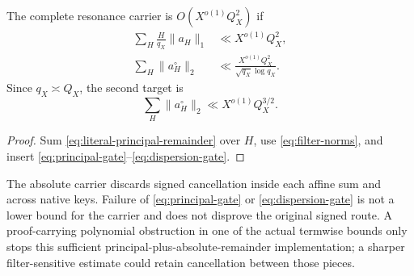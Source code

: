 \begin{corollary}
\label{cor:sufficient-gate}
The complete resonance carrier is
\(O(X^{o(1)}Q_X^2)\) if
\begin{align}
 \sum_H\frac{H}{q_X}\|a_H\|_1
 &\ll X^{o(1)}Q_X^2,
\label{eq:principal-gate}\\
 \sum_H\|a_H^\circ\|_2
 &\ll
 \frac{X^{o(1)}Q_X^2}
 {\sqrt{q_X}\log q_X}.
\label{eq:dispersion-gate}
\end{align}
Since \(q_X\asymp Q_X\), the second target is
\[
 \sum_H\|a_H^\circ\|_2
 \ll
 X^{o(1)}Q_X^{3/2}.
\]
\end{corollary}

\begin{proof}
Sum \eqref{eq:literal-principal-remainder} over \(H\), use
\eqref{eq:filter-norms}, and insert
\eqref{eq:principal-gate}--\eqref{eq:dispersion-gate}.
\end{proof}

\begin{remark}
The absolute carrier discards signed cancellation inside each affine
sum and across native keys.  Failure of
\eqref{eq:principal-gate} or \eqref{eq:dispersion-gate} is not a
lower bound for the carrier and does not disprove the original
signed route.  A proof-carrying polynomial obstruction in one of
the actual termwise bounds only stops this sufficient
principal-plus-absolute-remainder implementation; a sharper
filter-sensitive estimate could retain cancellation between those
pieces.
\end{remark}
